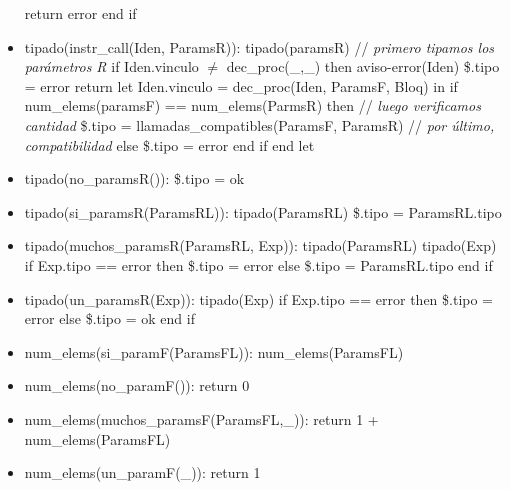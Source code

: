 \documentclass[11pt]{article}
\begin{document}
\begin{itemize}
                    \subsubitem return error
                \subitem end if
            \item tipado(instr\_call(Iden, ParamsR)): 
                \subitem tipado(paramsR) \/// \textit{primero tipamos los parámetros R}
                \subitem if Iden.vinculo $\neq$ dec\_proc(\_,\_) then
                    \subsubitem aviso-error(Iden)
                    \subsubitem \$.tipo = error
                    \subsubitem return
                \subitem let Iden.vinculo = dec\_proc(Iden, ParamsF, Bloq) in
                    \subsubitem if num\_elems(paramsF) == num\_elems(ParmsR) then \/// \textit{luego verificamos cantidad}
                        \subsubitem \hspace{2em} \$.tipo = llamadas\_compatibles(ParamsF, ParamsR) \/// \textit{por último, compatibilidad}
                    \subsubitem else
                        \subsubitem \hspace{2em} \$.tipo = error
                    \subsubitem end if
                \subitem end let
            \item tipado(no\_paramsR()): 
                \subitem \$.tipo = ok
            \item tipado(si\_paramsR(ParamsRL)): 
                \subitem tipado(ParamsRL)
                \subitem \$.tipo = ParamsRL.tipo
            \item tipado(muchos\_paramsR(ParamsRL, Exp)): 
                \subitem tipado(ParamsRL)
                \subitem tipado(Exp)
                \subitem if Exp.tipo == error then
                    \subsubitem \$.tipo = error
                \subitem else
                    \subsubitem \$.tipo = ParamsRL.tipo
                \subitem end if
            \item tipado(un\_paramsR(Exp)): 
                \subitem tipado(Exp)
                \subitem if Exp.tipo == error then
                    \subsubitem \$.tipo = error
                \subitem else
                    \subsubitem \$.tipo = ok
                \subitem end if
            \item num\_elems(si\_paramF(ParamsFL)):
                \subitem num\_elems(ParamsFL)
            \item num\_elems(no\_paramF()): 
                \subitem return 0
            \item num\_elems(muchos\_paramsF(ParamsFL,\_)): 
                \subitem return 1 + num\_elems(ParamsFL)
            \item num\_elems(un\_paramF(\_)): 
                \subitem return 1

\end{itemize}
\end{document}
